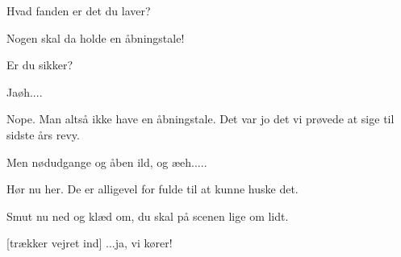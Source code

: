 \documentclass[a4paper,11pt]{article}
\begin{document}
\begin{sketch}

 Hvad fanden er det du laver?

 Nogen skal da holde en åbningstale!

 Er du sikker?

 Jaøh....





 Nope. Man altså ikke have en åbningstale. Det var jo det vi
prøvede at sige til sidste års revy.

 Men nødudgange og åben ild, og æeh.....

 Hør nu her. De er alligevel for fulde til at kunne huske det.

 Smut nu ned og klæd om, du skal på scenen lige om lidt.



 [trækker vejret ind] ...ja, vi kører!



\end{sketch}
\end{document}

